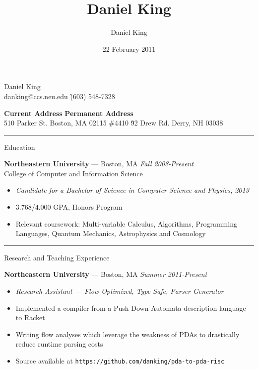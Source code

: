 \documentclass[10pt]{letter}
\author{Daniel King}
\title{Daniel King}
\date{22 February 2011}
\begin{document}
\begin{tabbing}{\Huge Daniel King} \\
\normalsize danking@ccs.neu.edu \`(603) 548-7328
\end{tabbing}

\vspace{-10pt}
\begin{tabbing}
\textbf{Current Address} \`\textbf{Permanent Address}\\
510 Parker St. Boston, MA 02115 \#4410 \`92 Drew Rd. Derry, NH 03038
\end{tabbing}\vspace{-15pt}
\rule{\linewidth}{.5pt}

{\Large Education}
\begin{tabbing}
{\large \bf Northeastern University} --- Boston, MA \` \textit{Fall 2008-Present} \\
College of Computer and Information Science
\end{tabbing}\vspace{-10pt}

\begin{itemize}
\setlength\itemsep{1pt}
\item [] {\textit{Candidate for a Bachelor of Science in Computer Science and
    Physics, 2013}}
\item{3.768/4.000 GPA, Honors Program}
\item{Relevant coursework: Multi-variable Calculus, Algorithms, Programming
  Languages, Quantum Mechanics, Astrophysics and Cosmology}
\end{itemize}

\rule{\linewidth}{.5pt}

{\Large Research and Teaching Experience}

\begin{tabbing}
{\large \bf Northeastern University} --- Boston, MA \` \textit{Summer 2011-Present}

\end{tabbing}
\begin{itemize}
\setlength\itemsep{1pt}
\item [] {\textit{Research Assistant --- Flow Optimized, Type Safe, Parser
    Generator}}
\item{Implemented a compiler from a Push Down Automata description language to Racket}
\item{Writing flow analyses which leverage the weakness of PDAs to drastically
  reduce runtime parsing costs}
\item{Source available at \texttt{https://github.com/danking/pda-to-pda-risc}}
\end{itemize}
\end{document}

